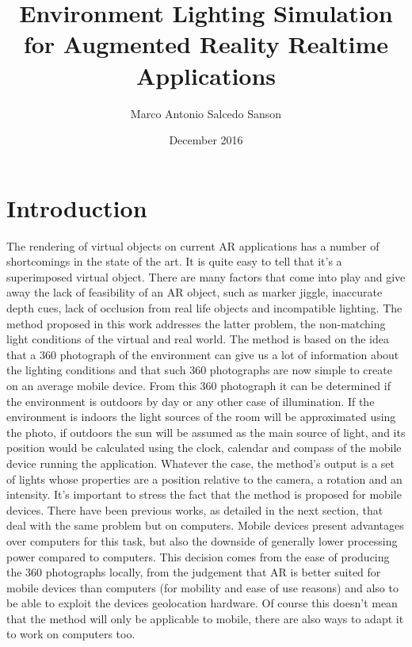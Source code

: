 \documentclass{article}
\title{Environment Lighting Simulation for Augmented Reality Realtime Applications}
\author{Marco Antonio Salcedo Sanson }
\date{December 2016}
\begin{document}
\maketitle

\section{Introduction}
The rendering of virtual objects on current AR applications has a number of shortcomings in the state of the art. It is quite easy to tell that it’s a superimposed virtual object. There are many factors that come into play and give away the lack of feasibility of an AR object, such as marker jiggle, inaccurate depth cues, lack of occlusion from real life objects and incompatible lighting.
The method proposed in this work addresses the latter problem, the non-matching light conditions of the virtual and real world. The method is based on the idea that a 360 photograph of the environment can give us a lot of information about the lighting conditions and that such 360 photographs are now simple to create on an average mobile device. From this 360 photograph it can be determined if the environment is outdoors by day or any other case of illumination. If the environment is indoors the light sources of the room will be approximated using the photo, if outdoors the sun will be assumed as the main source of light, and its position would be calculated using the clock, calendar and compass of the mobile device running the application. 
Whatever the case, the method's output is a set of lights whose properties are a position relative to the camera, a rotation and an intensity.
It's important to stress the fact that the method is proposed for mobile devices. There have been previous works, as detailed in the next section, that deal with the same problem but on computers. Mobile devices present advantages over computers for this task, but also the downside of generally lower processing power compared to computers. This decision comes from the ease of producing the 360 photographs locally, from the judgement that AR is better suited for mobile devices than computers (for mobility and ease of use reasons) and also to be able to exploit the devices geolocation hardware. Of course this doesn't mean that the method will only be applicable to mobile, there are also ways to adapt it to work on computers too.
\end{document}
